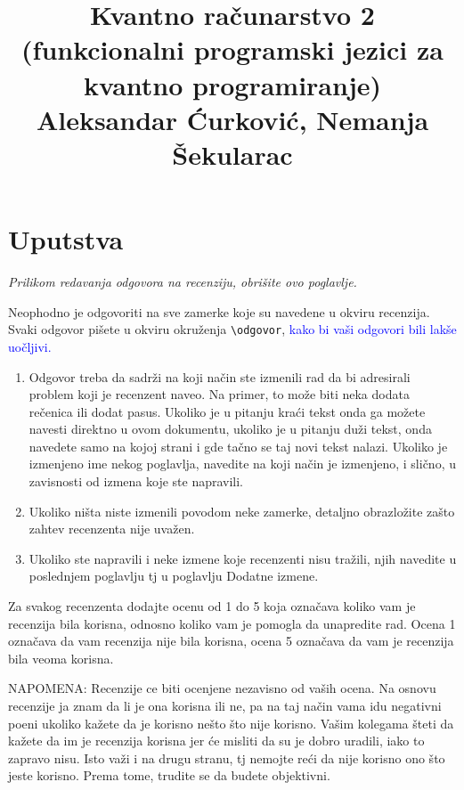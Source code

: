 \documentclass[a4paper]{report}
\newcommand{\odgovor}[1]{\textcolor{blue}{#1}}
\begin{document}
\title{Kvantno računarstvo 2 (funkcionalni programski
jezici za kvantno programiranje)\\ \small{Aleksandar Ćurković, Nemanja Šekularac}}

\maketitle
\tableofcontents


\chapter{Uputstva}
\emph{Prilikom redavanja odgovora na recenziju, obrišite ovo poglavlje.}

Neophodno je odgovoriti na sve zamerke koje su navedene u okviru recenzija. Svaki odgovor pišete u okviru okruženja \verb"\odgovor", \odgovor{kako bi vaši odgovori bili lakše uočljivi.} 
\begin{enumerate}

\item Odgovor treba da sadrži na koji način ste izmenili rad da bi adresirali problem koji je recenzent naveo. Na primer, to može biti neka dodata rečenica ili dodat pasus. Ukoliko je u pitanju kraći tekst onda ga možete navesti direktno u ovom dokumentu, ukoliko je u pitanju duži tekst, onda navedete samo na kojoj strani i gde tačno se taj novi tekst nalazi. Ukoliko je izmenjeno ime nekog poglavlja, navedite na koji način je izmenjeno, i slično, u zavisnosti od izmena koje ste napravili. 

\item Ukoliko ništa niste izmenili povodom neke zamerke, detaljno obrazložite zašto zahtev recenzenta nije uvažen.

\item Ukoliko ste napravili i neke izmene koje recenzenti nisu tražili, njih navedite u poslednjem poglavlju tj u poglavlju Dodatne izmene.
\end{enumerate}

Za svakog recenzenta dodajte ocenu od 1 do 5 koja označava koliko vam je recenzija bila korisna, odnosno koliko vam je pomogla da unapredite rad. Ocena 1 označava da vam recenzija nije bila korisna, ocena 5 označava da vam je recenzija bila veoma korisna. 

NAPOMENA: Recenzije ce biti ocenjene nezavisno od vaših ocena. Na osnovu recenzije ja znam da li je ona korisna ili ne, pa na taj način vama idu negativni poeni ukoliko kažete da je korisno nešto što nije korisno. Vašim kolegama šteti da kažete da im je recenzija korisna jer će misliti da su je dobro uradili, iako to zapravo nisu. Isto važi i na drugu stranu, tj nemojte reći da nije korisno ono što jeste korisno. Prema tome, trudite se da budete objektivni. 
\end{document}
